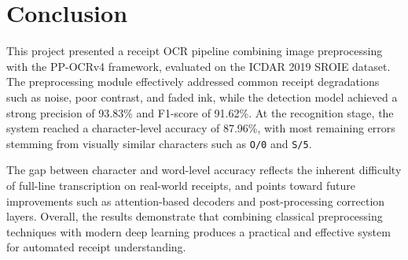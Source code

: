\section{Conclusion}

This project presented a receipt OCR pipeline combining image preprocessing with the
PP-OCRv4 framework, evaluated on the ICDAR 2019 SROIE dataset. The preprocessing module
effectively addressed common receipt degradations such as noise, poor contrast, and faded
ink, while the detection model achieved a strong precision of 93.83\% and F1-score of
91.62\%. At the recognition stage, the system reached a character-level accuracy of
87.96\%, with most remaining errors stemming from visually similar characters such as
\texttt{O/0} and \texttt{S/5}.

The gap between character and word-level accuracy reflects the inherent difficulty of
full-line transcription on real-world receipts, and points toward future improvements
such as attention-based decoders and post-processing correction layers. Overall, the
results demonstrate that combining classical preprocessing techniques with modern deep
learning produces a practical and effective system for automated receipt understanding.